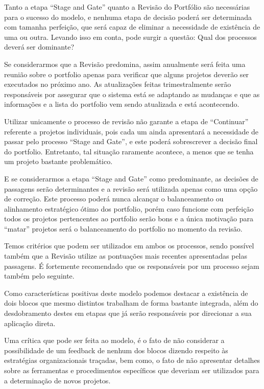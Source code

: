 \documentclass[12pt,a4paper,ruledheader,tocpage=prefix,floatnumber=continuous,pagestart=folhaderosto,font=times]{abnt}
\begin{document}
Tanto a etapa ``Stage and Gate'' quanto a Revisão do Portfólio são necessárias para o sucesso do modelo, e nenhuma etapa de decisão poderá ser determinada
com tamanha perfeição, que será capaz de eliminar a necessidade de existência de uma ou outra. Levando isso em conta, pode surgir a questão: Qual dos 
processos deverá ser dominante?

Se considerarmos que a Revisão predomina, assim anualmente será feita uma reunião sobre o portfolio apenas para verificar que alguns projetos deverão
ser executados no próximo ano. As atualizações feitas trimestralmente serão responsáveis por assegurar que o sistema está se adaptando as mudanças
e que as informações e a lista do portfolio vem sendo atualizada e está acontecendo. 

Utilizar unicamente o processo de revisão não garante a etapa de ``Continuar'' referente a projetos individuais, pois cada um ainda apresentará a 
necessidade de passar pelo processo ``Stage and Gate'', e este poderá sobrescrever a decisão final do portfolio. Entretanto, tal situação raramente 
acontece, a menos que se tenha um projeto bastante problemático.

E se considerarmos a etapa ``Stage and Gate'' como predominante, as decisões de passagens serão determinantes e a revisão será utilizada apenas como
uma opção de correção. Este processo poderá nunca alcançar o balanceamento ou alinhamento estratégico ótimo dos portfolio, porém caso funcione com perfeição
todos os projetos pertencentes ao portfolio serão bons e a única motivação para ``matar'' projetos será o balanceamento do portfolio no momento da 
revisão.

Temos critérios que podem ser utilizados em ambos os processos, sendo possível também que a Revisão utilize as pontuações mais recentes apresentadas pelas 
passagens. É fortemente recomendado que os responsáveis por um processo sejam também pelo seguinte.

Como características positivas deste modelo podemos destacar a existência de dois blocos que mesmo distintos trabalham de forma bastante integrada, 
além do desdobramento destes em etapas que já serão responsáveis por direcionar a sua aplicação direta.

Uma crítica que pode ser feita ao modelo, é o fato de não considerar a possibilidade de um feedback de nenhum dos blocos dizendo respeito às estratégias
organizacionais traçadas, bem como, o fato de não apresentar detalhes sobre as ferramentas e procedimentos específicos que deveriam ser utilizados
para a determinação de novos projetos.
\end{document}

